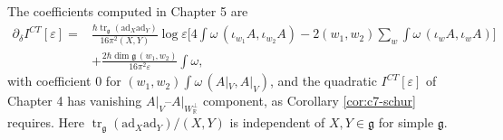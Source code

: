 The coefficients computed in Chapter 5 are
\[
\begin{aligned}
\partial_\delta I^{CT}[\varepsilon]={}&\frac{\hbar\operatorname{tr}_{\mathfrak g}(\mathrm{ad}_X\mathrm{ad}_Y)}{16\pi^2(X,Y)}\log\varepsilon\Big[4\int\omega\,(\iota_{w_1}A,\iota_{w_2}A)-2(w_1,w_2)\sum_w\int\omega\,(\iota_wA,\iota_wA)\Big]\\
&+\frac{2\hbar\dim\mathfrak g\,(w_1,w_2)}{16\pi^2\varepsilon}\int\omega ,
\end{aligned}
\]
with coefficient $0$ for $(w_1,w_2)\int\omega\,(A|_V,A|_V)$, and the quadratic $I^{CT}[\varepsilon]$ of Chapter 4 has vanishing $A|_V$--$A|_{W_{\mathbb R}^\perp}$ component, as Corollary \ref{cor:c7-schur} requires. Here $\operatorname{tr}_{\mathfrak g}(\mathrm{ad}_X\mathrm{ad}_Y)/(X,Y)$ is independent of $X,Y\in\mathfrak g$ for simple $\mathfrak g$.

